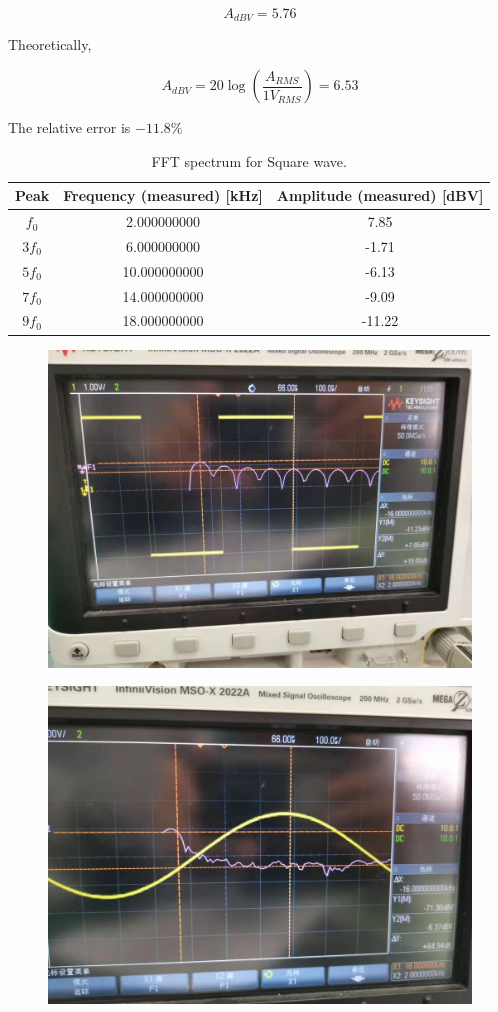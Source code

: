 \documentclass[a4paper]{report}
\begin{document}
$$A_{dBV}=5.76$$

Theoretically,

$$A_{dBV}=20\log\left(\frac{A_{RMS}}{1V_{RMS}}\right)=6.53$$

The relative error is $-11.8\%$
\begin{table}[H]
	\centering
	\begin{tabular}{|c|c|c|}
		\hline
		Peak   & Frequency (measured) [kHz] & Amplitude (measured) [dBV] \\
		\hline
		$f_0$  & 2.000000000                & 7.85                       \\
		\hline
		$3f_0$ & 6.000000000                & -1.71                      \\
		\hline
		$5f_0$ & 10.000000000               & -6.13                      \\
		\hline
		$7f_0$ & 14.000000000               & -9.09                      \\
		\hline
		$9f_0$ & 18.000000000               & -11.22                     \\
		\hline
	\end{tabular}
	\caption{FFT spectrum for Square wave.}
\end{table}
\begin{figure}[H]
	\centering
	\includegraphics[width=0.8\linewidth]{8.jpg}
\end{figure}
\begin{figure}[H]
	\centering
	\includegraphics[width=0.8\linewidth]{9.jpg}
\end{figure}
\end{document}
